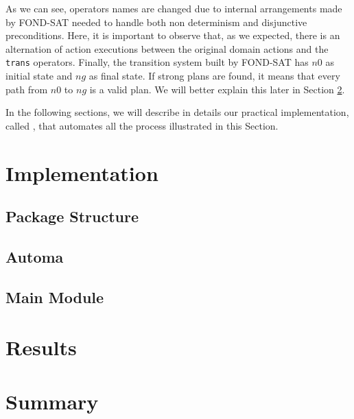 \begin{example}
\begin{lstlisting}[numberstyle=\tiny\color{codegray}\noncopynumber,numbers=left,stepnumber=1, escapechar=£]
\end{lstlisting}
As we can see, operators names are changed due to internal arrangements made by FOND-SAT needed to handle both non determinism and disjunctive preconditions. Here, it is important to observe that, as we expected, there is an alternation of action executions between the original domain actions and the \texttt{trans} operators. Finally, the transition system built by FOND-SAT has $n0$ as initial state and $ng$ as final state. If strong plans are found, it means that every path from $n0$ to $ng$ is a valid plan. We will better explain this later in Section \ref{sec:planning-results}.
\end{example}

In the following sections, we will describe in details our practical implementation, called \FONDFOR, that automates all the process illustrated in this Section.

\section{Implementation}\label{sec:planning-implementation}
\subsection{Package Structure}
\subsection{\PDDL}
\subsection{Automa}
\subsection{Main Module}
\section{Results}\label{sec:planning-results}
\section{Summary}
